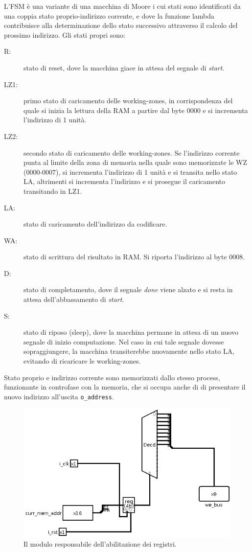 \documentclass[11pt,a4paper]{article}
\begin{document}
L'FSM è una variante di una macchina di Moore i cui stati sono identificati da una coppia stato proprio-indirizzo corrente, e dove la funzione lambda
contribuisce alla determinazione dello stato successivo attraverso il calcolo del prossimo indirizzo. Gli stati propri sono:
\begin{description}
    \item[R:] stato di reset, dove la macchina giace in attesa del segnale di \emph{start}.
    \item[LZ1:] primo stato di caricamento delle working-zones, in corrispondenza del quale si inizia la lettura della RAM a partire dal byte 0000 e si
        incrementa l'indirizzo di 1 unità.
    \item[LZ2:] secondo stato di caricamento delle working-zones. Se l'indirizzo corrente punta al limite della zona di memoria nella quale sono
        memorizzate le WZ (0000-0007), si incrementa l'indirizzo di 1 unità e si transita nello stato LA, altrimenti si incrementa l'indirizzo e si
        prosegue il caricamento transitando in LZ1.
    \item[LA:] stato di caricamento dell'indirizzo da codificare.
    \item[WA:] stato di scrittura del risultato in RAM. Si riporta l'indirizzo al byte 0008.
    \item[D:] stato di completamento, dove il segnale \emph{done} viene alzato e si resta in attesa dell'abbassamento di \emph{start}.
    \item[S:] stato di riposo (sleep), dove la macchina permane in attesa di un nuovo segnale di inizio computazione. Nel caso in cui tale segnale dovesse
        sopraggiungere, la macchina transiterebbe nuovamente nello stato LA, evitando di ricaricare le working-zones.
\end {description}
Stato proprio e indirizzo corrente sono memorizzati dallo stesso process, funzionante in controfase con la memoria, che si occupa anche di di presentare
il nuovo indirizzo all'uscita \lstinline{o_address}.

\begin{figure}[ht]
    \includegraphics[scale=0.5]{reg_enabler.png}
    \caption[Gestore registri]{Il modulo responsabile dell'abilitazione dei registri.\label{reg_enabler}}
\end{figure}
\end{document}
